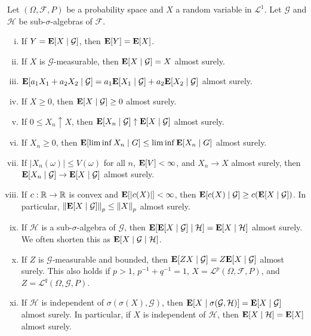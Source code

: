 \begin{lemma}
	Let $(\Omega,\mathcal{F},P)$ be a probability space and $X$ a random variable in $\mathcal{L}^1$. Let $\mathcal{G}$ and $\mathcal{H}$ be sub-$\sigma$-algebras of $\mathcal{F}$.
	\begin{enumerate}[(i)]
		\item If $Y=\textbf{E}[X\mid\mathcal{G}]$, then $\textbf{E}[Y]=\textbf{E}[X]$.
		\item If $X$ is $\mathcal{G}$-measurable, then $\textbf{E}[X\mid\mathcal{G}]=X$ almost surely.
		\item $\textbf{E}[a_1X_1 + a_2X_2\mid\mathcal{G}] = a_1\textbf{E}[X_1\mid\mathcal{G}] + a_2\textbf{E}[X_2\mid\mathcal{G}]$ almost surely.
		\item If $X\geq 0$, then $\textbf{E}[X\mid\mathcal{G}]\geq 0$ almost surely.
		\item If $0\leq X_n\uparrow X$, then $\textbf{E}[X_n\mid\mathcal{G}]\uparrow\textbf{E}[X\mid\mathcal{G}]$ almost surely.
		\item If $X_n\geq 0$, then $\textbf{E}[\liminf X_n\mid G] \leq \liminf \textbf{E}[X_n\mid G]$ almost surely.
		\item If $|X_n(\omega)|\leq V(\omega)$ for all $n$, $\textbf{E}[V]<\infty$, and $X_n\to X$ almost surely, then $\textbf{E}[X_n\mid\mathcal{G}] \to \textbf{E}[X\mid\mathcal{G}]$ almost surely.
		\item If $c:\mathbb{R}\to\mathbb{R}$ is convex and $\textbf{E}[|c(X)|]<\infty$, then $\textbf{E}[c(X)\mid\mathcal{G}] \geq c(\textbf{E}[X\mid\mathcal{G}])$. In particular, $\left\lVert\textbf{E}[X\mid\mathcal{G}]\right\rVert_p \leq \left\lVert X\right\rVert_p$ almost surely.
		\item If $\mathcal{H}$ is a sub-$\sigma$-algebra of $\mathcal{G}$, then $\textbf{E}[\textbf{E}[X\mid\mathcal{G}]\mid\mathcal{H}] = \textbf{E}[X\mid\mathcal{H}]$ almost surely. We often shorten this as $\textbf{E}[X\mid\mathcal{G}\mid\mathcal{H}]$.
		\item If $Z$ is $\mathcal{G}$-measurable and bounded, then $\textbf{E}[ZX\mid\mathcal{G}]=Z\textbf{E}[X\mid\mathcal{G}]$ almost surely. This also holds if $p>1$, $p^{-1}+q^{-1}=1$, $X=\mathcal{L}^p(\Omega,\mathcal{F},P)$, and $Z=\mathcal{L}^q(\Omega,\mathcal{G},P)$.
		\item If $\mathcal{H}$ is independent of $\sigma(\sigma(X),\mathcal{G})$, then $\textbf{E}[X\mid\sigma(\mathcal{G},\mathcal{H})] = \textbf{E}[X\mid\mathcal{G}]$ almost surely. In particular, if $X$ is independent of $\mathcal{H}$, then $\textbf{E}[X\mid\mathcal{H}]=\textbf{E}[X]$ almost surely.
	\end{enumerate}
\end{lemma}

